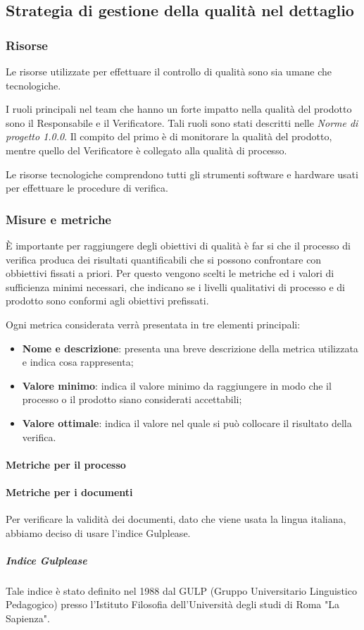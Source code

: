 \subsection{Strategia di gestione della qualità nel dettaglio}
\subsubsection{Risorse}
Le risorse utilizzate per effettuare il controllo di qualità sono sia umane che tecnologiche.

I ruoli principali nel team che hanno un forte impatto nella qualità del prodotto sono il Responsabile e il Verificatore. Tali ruoli sono stati descritti nelle \textit{Norme di progetto 1.0.0}\docs. Il compito del primo è di monitorare la qualità del prodotto, mentre quello del Verificatore è collegato alla qualità di processo.

Le risorse tecnologiche comprendono tutti gli strumenti software e hardware usati per effettuare le procedure di verifica. 
\subsubsection{Misure e metriche}
\`{E} importante per raggiungere degli obiettivi di qualità è far si che il processo di verifica produca dei risultati quantificabili che si possono confrontare con obbiettivi fissati a priori. Per questo vengono scelti le metriche ed i valori di sufficienza minimi necessari, che indicano se i livelli qualitativi di processo e di prodotto sono conformi agli obiettivi prefissati.

Ogni metrica considerata verrà presentata in tre elementi principali:
\begin{itemize}
	\item \textbf{Nome e descrizione}: presenta una breve descrizione della metrica utilizzata e indica cosa rappresenta;
	\item \textbf{Valore minimo}: indica il valore minimo da raggiungere in modo che il processo o il prodotto siano considerati accettabili;
	\item \textbf{Valore ottimale}: indica il valore nel quale si può collocare il risultato della verifica.
\end{itemize}

\paragraph{Metriche per il processo}
\paragraph{Metriche per i documenti}
Per verificare la validità dei documenti, dato che viene usata la lingua italiana, abbiamo deciso di usare l'indice Gulplease. 
\subparagraph*{Indice Gulplease}
Tale indice è stato definito nel 1988 dal GULP (Gruppo Universitario Linguistico Pedagogico) presso l'Istituto Filosofia dell'Università degli studi di Roma "La Sapienza".

